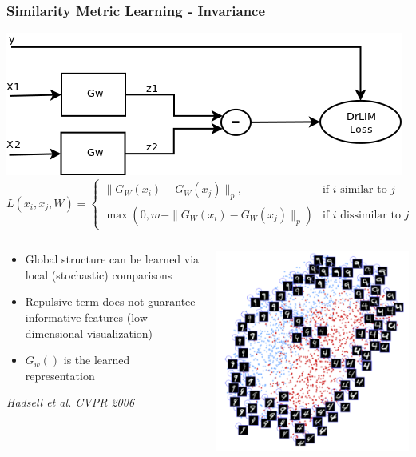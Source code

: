 \documentclass{beamer}
\begin{document}
\begin{frame} 
\frametitle{Similarity Metric Learning - Invariance}
\centering
\includegraphics[scale=0.4]{./Figures/drlim_diag.png}
\begin{equation} 
\nonumber
L(x_i,x_j,W)=\left\{
                \begin{array}{ll}
                 \|G_W(x_i) - G_W(x_{j})\|_p, &\text{if $i$ similar to $j$}  \\
                 \max(0,m-\|G_W(x_i) - G_W(x_{j})\|_p) &\text{if $i$ dissimilar to $j$}
                \end{array}
              \right.
\end{equation} 
\begin{columns}[T] %
\begin{column}{.6\textwidth}
\begin{itemize} 
\item{Global structure can be learned via local (stochastic) comparisons}
\item{Repulsive term does not guarantee informative features (low-dimensional visualization)} 
\item{$G_w()$ is the learned representation}   
\end{itemize} 
\emph{\tiny{Hadsell et al. CVPR 2006}}
\end{column}%
\begin{column}{.4\textwidth}
\includegraphics[scale=0.2]{./Figures/mnist.png}

\end{column}
\end{columns}
\end{frame}
\end{document}
